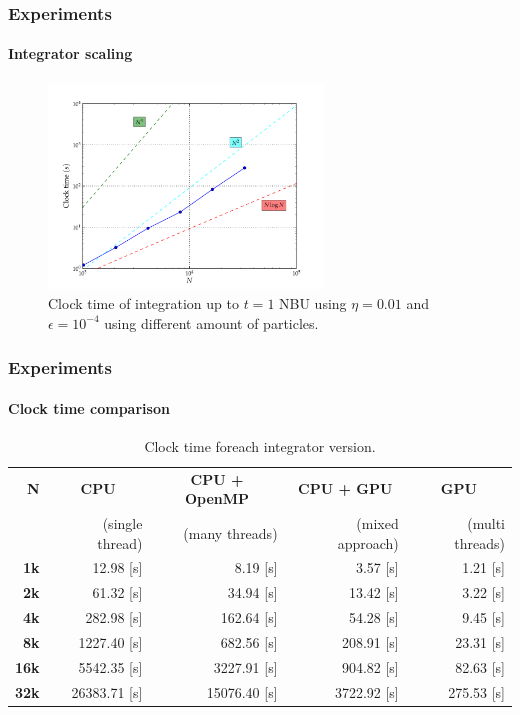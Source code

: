 \begin{frame}
    \frametitle{Experiments}
    \framesubtitle{Integrator scaling}

\begin{figure}[H]
    \centering
    \label{fig:time}
    \includegraphics[width=0.65\textwidth]{img/test_time-1t-N.pdf}
    \caption{Clock time of integration up to $t=1$ NBU using $\eta = 0.01$ and
             $\epsilon = 10^{-4}$ using different amount of particles.}
\end{figure}

\end{frame}
\begin{frame}
    \frametitle{Experiments}
    \framesubtitle{Clock time comparison}


\begin{table}[H]
    \centering
    \footnotesize
    \begin{tabular}{rrrrr}
        \hline
        {\bf N} & \multicolumn{1}{c}{\bf CPU}
                & \multicolumn{1}{c}{\bf CPU + OpenMP}
                & \multicolumn{1}{c}{\bf CPU + GPU}
                & \multicolumn{1}{c}{\bf GPU}   \\
                & (single thread) & (many threads)     & (mixed approach) &  (multi threads) \\ \hline
         {\bf  1k} &    12.98 [s] &   8.19 [s] &    3.57 [s]           &    1.21 [s]          \\
         {\bf  2k} &    61.32 [s] &  34.94 [s] &   13.42 [s]           &    3.22 [s]          \\
         {\bf  4k} &   282.98 [s] & 162.64 [s] &   54.28 [s]           &    9.45 [s]          \\
         {\bf  8k} &  1227.40 [s] & 682.56 [s] &  208.91 [s]           &   23.31 [s]          \\
         {\bf 16k} &  5542.35 [s] & 3227.91 [s] &  904.82 [s]           &   82.63 [s]          \\
         {\bf 32k} & 26383.71 [s] & 15076.40 [s] & 3722.92 [s]           &  275.53 [s]          \\ \hline
    \end{tabular}
    \caption{Clock time foreach integrator version.}
    \label{tab:acc}
\end{table}

\end{frame}

